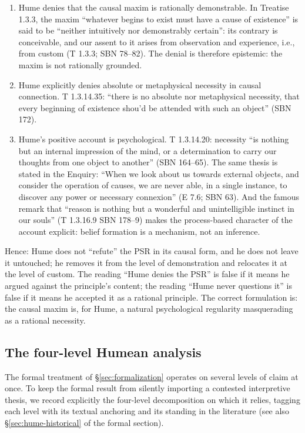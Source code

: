 \documentclass[11pt]{article}
\theoremstyle{plain}
\theoremstyle{definition}
\theoremstyle{remark}
\begin{document}
\begin{enumerate}
\item[(a)] Hume denies that the causal maxim is rationally demonstrable.
In Treatise 1.3.3, the maxim ``whatever begins to exist must have a
cause of existence'' is said to be ``neither intuitively nor
demonstrably certain'': its contrary is conceivable, and our assent to
it arises from observation and experience, i.e., from custom (T 1.3.3;
SBN 78--82). The denial is therefore epistemic: the maxim is not
rationally grounded.
\item[(b)] Hume explicitly denies absolute or metaphysical necessity in
causal connection. T 1.3.14.35: ``there is no absolute nor metaphysical
necessity, that every beginning of existence shou'd be attended with
such an object'' (SBN 172).
\item[(c)] Hume's positive account is psychological. T 1.3.14.20:
necessity ``is nothing but an internal impression of the mind, or a
determination to carry our thoughts from one object to another'' (SBN
164--65). The same thesis is stated in the Enquiry: ``When we look
about us towards external objects, and consider the operation of
causes, we are never able, in a single instance, to discover any power
or necessary connexion'' (E 7.6; SBN 63). And the famous remark that
``reason is nothing but a wonderful and unintelligible instinct in our
souls'' (T 1.3.16.9 SBN 178--9) makes the process-based character of
the account explicit: belief formation is a mechanism, not an
inference.
\end{enumerate}

Hence: Hume does not ``refute'' the PSR in its causal form, and he does
not leave it untouched; he removes it from the level of demonstration
and relocates it at the level of custom. The reading ``Hume denies the
PSR'' is false if it means he argued against the principle's content;
the reading ``Hume never questions it'' is false if it means he
accepted it as a rational principle. The correct formulation is: the
causal maxim is, for Hume, a natural psychological regularity
masquerading as a rational necessity.

\subsection{The four-level Humean analysis}
\label{sec:hume-four-levels}

The formal treatment of \S\ref{sec:formalization} operates on several
levels of claim at once. To keep the formal result from silently
importing a contested interpretive thesis, we record explicitly the
four-level decomposition on which it relies, tagging each level with
its textual anchoring and its standing in the literature (see also
\S\ref{sec:hume-historical} of the formal section).
\end{document}
